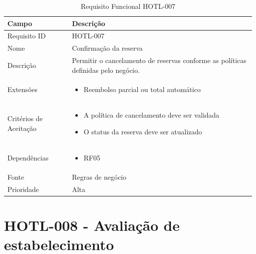 \documentclass[
    12pt,
    oneside,
    a4paper,
    brazil
]{abntex2}
\begin{document}
\begin{table}[h]
	\begin{tabular}{|l|p{10cm}|}
		\hline
		\textbf{Campo} & \textbf{Descrição} \\
		\hline
		Requisito ID & HOTL-007 \\
		\hline
		Nome & Confirmação da reserva\\
		\hline
		Descrição & Permitir o cancelamento de reservas conforme as políticas definidas pelo negócio. \\
		\hline
		Extensões & \begin{itemize}[leftmargin=*, labelsep=0.5em, noitemsep, topsep=0pt]
		\item Reembolso parcial ou total automático
		\end{itemize} \\
		\hline
		Critérios de Aceitação & \begin{itemize}[leftmargin=*, labelsep=0.5em, noitemsep, topsep=0pt]
		\item A política de cancelamento deve ser validada
		\item O status da reserva deve ser atualizado
		\end{itemize} \\
		\hline
		Dependências & \begin{itemize}[leftmargin=*, labelsep=0.5em, noitemsep, topsep=0pt] 
		\item RF05
		\end{itemize} \\
		\hline
		Fonte & Regras de negócio \\
		\hline
		Prioridade & Alta \\
		\hline
	\end{tabular}
	\caption{Requisito Funcional HOTL-007}
\end{table}

\section{HOTL-008 - Avaliação de estabelecimento}
\end{document}
